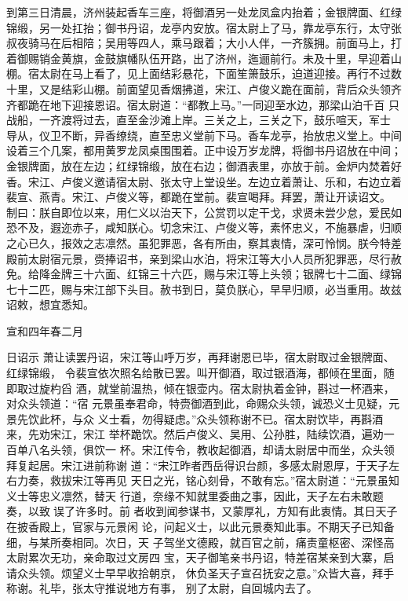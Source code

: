 到第三日清晨，济州装起香车三座，将御酒另一处龙凤盒内抬着；金银牌面、红绿
锦缎，另一处扛抬；御书丹诏，龙亭内安放。宿太尉上了马，靠龙亭东行，太守张
叔夜骑马在后相陪；吴用等四人，乘马跟着；大小人伴，一齐簇拥。前面马上，打
着御赐销金黄旗，金鼓旗幡队伍开路，出了济州，迤逦前行。未及十里，早迎着山
棚。宿太尉在马上看了，见上面结彩悬花，下面笙箫鼓乐，迫道迎接。再行不过数
十里，又是结彩山棚。前面望见香烟拂道，宋江、卢俊义跪在面前，背后众头领齐
齐都跪在地下迎接恩诏。宿太尉道：“都教上马。”一同迎至水边，那梁山泊千百
只战船，一齐渡将过去，直至金沙滩上岸。三关之上，三关之下，鼓乐喧天，军士
导从，仪卫不断，异香缭绕，直至忠义堂前下马。香车龙亭，抬放忠义堂上。中间
设着三个几案，都用黄罗龙凤桌围围着。正中设万岁龙牌，将御书丹诏放在中间；
金银牌面，放在左边；红绿锦缎，放在右边；御酒表里，亦放于前。金炉内焚着好
香。宋江、卢俊义邀请宿太尉、张太守上堂设坐。左边立着萧让、乐和，右边立着
裴宣、燕青。宋江、卢俊义等，都跪在堂前。裴宣喝拜。拜罢，萧让开读诏文。
制曰：朕自即位以来，用仁义以治天下，公赏罚以定干戈，求贤未尝少怠，爱民如
恐不及，遐迩赤子，咸知朕心。切念宋江、卢俊义等，素怀忠义，不施暴虐，归顺
之心已久，报效之志凛然。虽犯罪恶，各有所由，察其衷情，深可怜悯。朕今特差
殿前太尉宿元景，赍捧诏书，亲到梁山水泊，将宋江等大小人员所犯罪恶，尽行赦
免。给降金牌三十六面、红锦三十六匹，赐与宋江等上头领；银牌七十二面、绿锦
七十二匹，赐与宋江部下头目。赦书到日，莫负朕心，早早归顺，必当重用。故兹
诏敕，想宜悉知。

宣和四年春二月

日诏示
萧让读罢丹诏，宋江等山呼万岁，再拜谢恩已毕，宿太尉取过金银牌面、红绿锦缎，
令裴宣依次照名给散已罢。叫开御酒，取过银酒海，都倾在里面，随即取过旋杓舀
酒，就堂前温热，倾在银壶内。宿太尉执着金钟，斟过一杯酒来，对众头领道：“宿
元景虽奉君命，特赍御酒到此，命赐众头领，诚恐义士见疑，元景先饮此杯，与众
义士看，勿得疑虑。”众头领称谢不已。宿太尉饮毕，再斟酒来，先劝宋江，宋江
举杯跪饮。然后卢俊义、吴用、公孙胜，陆续饮酒，遍劝一百单八名头领，俱饮一
杯。宋江传令，教收起御酒，却请太尉居中而坐，众头领拜复起居。宋江进前称谢
道：“宋江昨者西岳得识台颜，多感太尉恩厚，于天子左右力奏，救拔宋江等再见
天日之光，铭心刻骨，不敢有忘。”宿太尉道：“元景虽知义士等忠义凛然，替天
行道，奈缘不知就里委曲之事，因此，天子左右未敢题奏，以致误了许多时。前
者收到闻参谋书，又蒙厚礼，方知有此衷情。其日天子在披香殿上，官家与元景闲
论，问起义士，以此元景奏知此事。不期天子已知备细，与某所奏相同。次日，天
子驾坐文德殿，就百官之前，痛责童枢密、深怪高太尉累次无功，亲命取过文房四
宝，天子御笔亲书丹诏，特差宿某亲到大寨，启请众头领。烦望义士早早收拾朝京，
休负圣天子宣召抚安之意。”众皆大喜，拜手称谢。礼毕，张太守推说地方有事，
别了太尉，自回城内去了。


